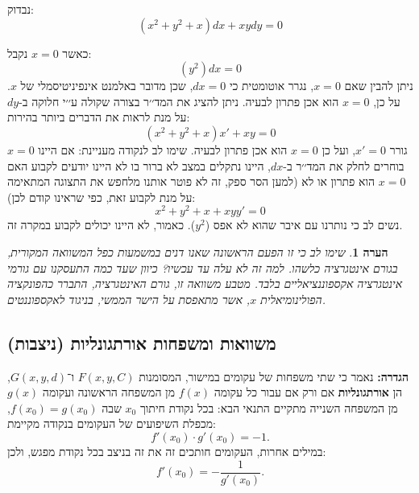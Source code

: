 \documentclass{article}
\numberwithin{equation}{section}
\newtheorem{remark}{הערה}[section]
\begin{document}
נבדוק:  
\[
(x^2 + y^2 + x)dx + xydy = 0
\]

כאשר $x=0$ נקבל:
\[
(y^2)dx = 0
\]
ניתן להבין שאם $x=0$, נגרר אוטומטית כי $dx=0$, שכן מדובר באלמנט אינפיניטיסמלי של $x$. 
על כן, $x=0$ הוא אכן פתרון לבעיה. ניתן להציג את המד׳׳ר בצורה שקולה ע׳׳י חלוקה ב-$dy$ על מנת לראות את הדברים ביותר בהירות:
\[
(x^2 + y^2 + x)x' + xy = 0
\]
$x=0$ גורר $x'=0$, ועל כן $x=0$ הוא אכן פתרון לבעיה. שימו לב לנקודה מעניינת: אם היינו בוחרים לחלק את המד׳׳ר ב-$dx$, היינו נתקלים במצב לא ברור בו לא היינו יודעים לקבוע האם $x=0$ הוא פתרון או לא (למען הסר ספק, זה לא פוטר אותנו מלחפש את התצוגה המתאימה על מנת לקבוע זאת, כפי שראינו קודם לכן):
\[
x^2 + y^2 + x + xyy' = 0
\]
נשים לב כי נותרנו עם איבר שהוא לא אפס ($y^{2}$). כאמור, לא היינו יכולים לקבוע במקרה זה.

\begin{remark}
    שימו לב כי זו הפעם הראשונה שאנו דנים במשמעות כפל המשוואה המקורית, בגורם אינטגרציה כלשהו. למה זה לא עלה עד עכשיו? כיוון שעד כמה התעסקנו עם גורמי אינטגרציה אקספוננציאליים בלבד. מטבע משוואה זו, גורם האינטגרציה, התברר כהפונקציה הפולינומיאלית $x$, אשר מתאפסת על הישר הממשי, בניגוד לאקספוננטים.
\end{remark}

\newpage
\subsection{משוואות ומשפחות אורתגונליות (ניצבות)}

\textbf{הגדרה:}  
נאמר כי שתי משפחות של עקומים במישור, המסומנות $F(x,y,C)$ ו־$G(x,y,d)$, הן \textbf{אורתגונליות} אם ורק אם עבור כל עקומה $f(x)$ מן המשפחה הראשונה ועקומה $g(x)$ מן המשפחה השנייה מתקיים התנאי הבא:  
בכל נקודת חיתוך $x_0$ שבה $f(x_0)=g(x_0)$, מכפלת השיפועים של העקומים בנקודה מקיימת:
\[
f'(x_0)\cdot g'(x_0) = -1.
\]
במילים אחרות, העקומים חותכים זה את זה בניצב בכל נקודת מפגש, ולכן:
\begin{equation}
f'(x_0) = -\frac{1}{g'(x_0)}.
\end{equation}
\end{document}
